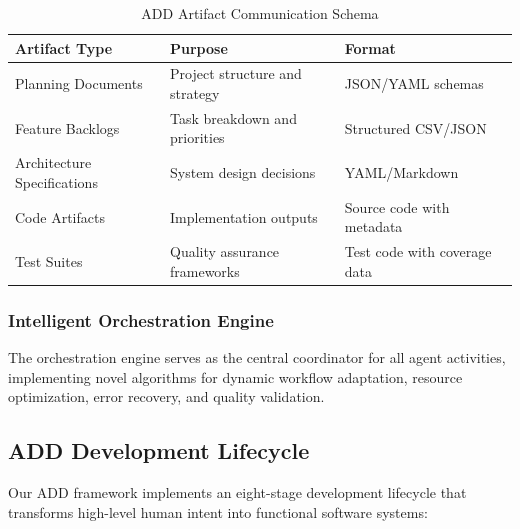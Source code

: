 \begin{table}[ht]
\centering
\begin{tabular}{@{}lll@{}}
\toprule
\textbf{Artifact Type} & \textbf{Purpose} & \textbf{Format} \\
\midrule
Planning Documents & Project structure and strategy & JSON/YAML schemas \\
Feature Backlogs & Task breakdown and priorities & Structured CSV/JSON \\
Architecture Specifications & System design decisions & YAML/Markdown \\
Code Artifacts & Implementation outputs & Source code with metadata \\
Test Suites & Quality assurance frameworks & Test code with coverage data \\
\bottomrule
\end{tabular}
\caption{ADD Artifact Communication Schema}
\label{tab:add-artifacts}
\end{table}

\subsubsection{Intelligent Orchestration Engine}

The orchestration engine serves as the central coordinator for all agent activities, implementing novel algorithms for dynamic workflow adaptation, resource optimization, error recovery, and quality validation.

\subsection{ADD Development Lifecycle}

Our ADD framework implements an eight-stage development lifecycle that transforms high-level human intent into functional software systems:

